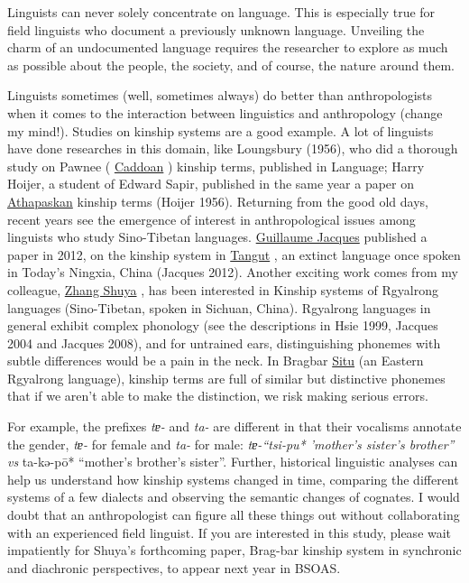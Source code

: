 \documentclass[
  a4paper,
  14pt,
  oneside,
  tablecaptionabove
]{scrbook}
\begin{document}
Linguists can never solely concentrate on language. This is especially
true for field linguists who document a previously unknown language.
Unveiling the charm of an undocumented language requires the researcher
to explore as much as possible about the people, the society, and of
course, the nature around them.

Linguists sometimes (well, sometimes always) do better than
anthropologists when it comes to the interaction between linguistics and
anthropology (change my mind!). Studies on kinship systems are a good
example. A lot of linguists have done researches in this domain, like
Loungsbury (1956), who did a thorough study on Pawnee (
\href{https://glottolog.org/resource/languoid/id/pawn1254}{Caddoan} )
kinship terms, published in Language; Harry Hoijer, a student of Edward
Sapir, published in the same year a paper on
\href{https://glottolog.org/resource/languoid/id/atha1247}{Athapaskan}
kinship terms (Hoijer 1956). Returning from the good old days, recent
years see the emergence of interest in anthropological issues among
linguists who study Sino-Tibetan languages.
\href{https://panchr.hypotheses.org}{Guillaume Jacques} published a
paper in 2012, on the kinship system in
\href{https://glottolog.org/resource/languoid/id/tang1334}{Tangut} , an
extinct language once spoken in Today's Ningxia, China (Jacques 2012).
Another exciting work comes from my colleague,
\href{https://inalco.academia.edu/zhangshuya}{Zhang Shuya} , has been
interested in Kinship systems of Rgyalrong languages (Sino-Tibetan,
spoken in Sichuan, China). Rgyalrong languages in general exhibit
complex phonology (see the descriptions in Hsie 1999, Jacques 2004 and
Jacques 2008), and for untrained ears, distinguishing phonemes with
subtle differences would be a pain in the neck. In Bragbar
\href{https://glottolog.org/resource/languoid/id/situ1238}{Situ} (an
Eastern Rgyalrong language), kinship terms are full of similar but
distinctive phonemes that if we aren't able to make the distinction, we
risk making serious errors.

For example, the prefixes \emph{tɐ-} and \emph{ta-} are different in
that their vocalisms annotate the gender, \emph{tɐ-} for female and
\emph{ta-} for male: \emph{tɐ-\enquote{tsi-pu* 'mother's sister's
brother} vs }ta-kə-pō* \enquote{mother's brother's sister}. Further,
historical linguistic analyses can help us understand how kinship
systems changed in time, comparing the different systems of a few
dialects and observing the semantic changes of cognates. I would doubt
that an anthropologist can figure all these things out without
collaborating with an experienced field linguist. If you are interested
in this study, please wait impatiently for Shuya's forthcoming paper,
Brag-bar kinship system in synchronic and diachronic perspectives, to
appear next year in BSOAS.
\end{document}
